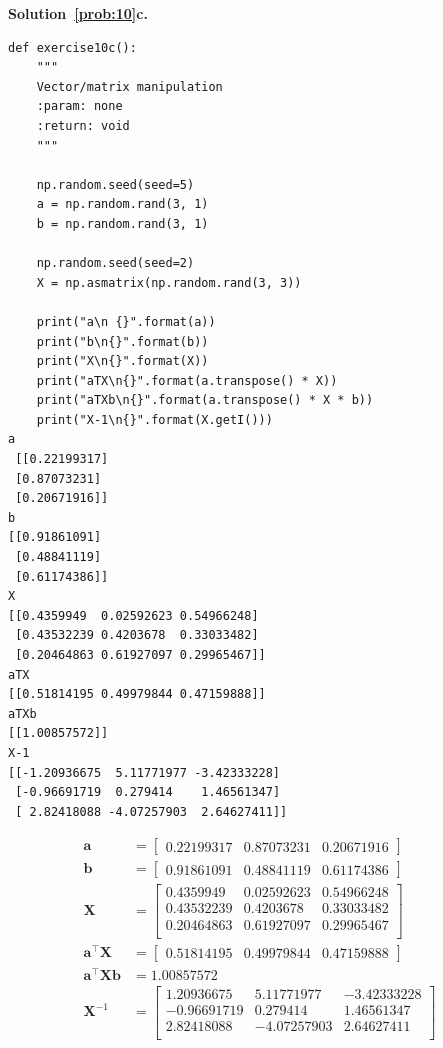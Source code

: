 \documentclass[10pt]{article}
\begin{document}
\begin{enumerate}
{\bf Solution~\ref{prob:10}c.} 

\begin{verbatim}
def exercise10c():
    """
    Vector/matrix manipulation
    :param: none
    :return: void
    """

    np.random.seed(seed=5)
    a = np.random.rand(3, 1)
    b = np.random.rand(3, 1)

    np.random.seed(seed=2)
    X = np.asmatrix(np.random.rand(3, 3))

    print("a\n {}".format(a))
    print("b\n{}".format(b))
    print("X\n{}".format(X))
    print("aTX\n{}".format(a.transpose() * X))
    print("aTXb\n{}".format(a.transpose() * X * b))
    print("X-1\n{}".format(X.getI()))
a
 [[0.22199317]
 [0.87073231]
 [0.20671916]]
b
[[0.91861091]
 [0.48841119]
 [0.61174386]]
X
[[0.4359949  0.02592623 0.54966248]
 [0.43532239 0.4203678  0.33033482]
 [0.20464863 0.61927097 0.29965467]]
aTX
[[0.51814195 0.49979844 0.47159888]]
aTXb
[[1.00857572]]
X-1
[[-1.20936675  5.11771977 -3.42333228]
 [-0.96691719  0.279414    1.46561347]
 [ 2.82418088 -4.07257903  2.64627411]]
\end{verbatim}

\begin{equation}
\begin{aligned}
  \mathbf{a} &=
  \begin{bmatrix}
	0.22199317 & 0.87073231 & 0.20671916
  \end{bmatrix}
  \\
  \mathbf{b} &=
  \begin{bmatrix}
    0.91861091 & 0.48841119 & 0.61174386
  \end{bmatrix}
  \\
  \mathbf{X} &=
  \begin{bmatrix}
    0.4359949  & 0.02592623 & 0.54966248 \\
    0.43532239 & 0.4203678  & 0.33033482 \\
    0.20464863 & 0.61927097 & 0.29965467 \\
  \end{bmatrix}
  \\
  \mathbf{a}^\top\mathbf{X} &=
  \begin{bmatrix}
    0.51814195 & 0.49979844 & 0.47159888
  \end{bmatrix}
  \\
  \mathbf{a}^\top\mathbf{X}\mathbf{b} &= 1.00857572
  \\
  \mathbf{X}^{-1} &=
  \begin{bmatrix}
     1.20936675  &  5.11771977  & -3.42333228 \\
    -0.96691719  &  0.279414    &  1.46561347 \\
     2.82418088  & -4.07257903  &  2.64627411 \\
  \end{bmatrix}
\end{aligned}
\end{equation}


\end{enumerate}
\end{document}
